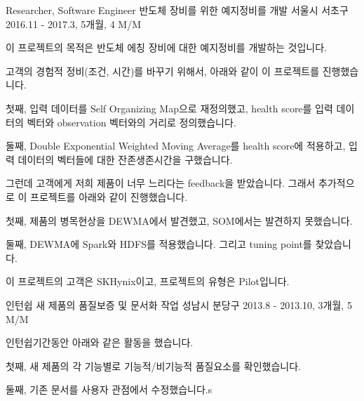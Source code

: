 \begin{cventries}
  \cventry
    {Researcher, Software Engineer} %
    {반도체 장비를 위한 예지정비를 개발} %
    {서울시 서초구} %
    {2016.11 - 2017.3, 5개월, 4 M/M} %
    {
      \begin{cvitems} %
        \item {이 프로젝트의 목적은 반도체 에칭 장비에 대한 예지정비를 개발하는 것입니다.}
        \item {고객의 경험적 정비(조건, 시간)를 바꾸기 위해서, 아래와 같이 이 프로젝트를 진행했습니다.}
        \item {첫째, 입력 데이터를 Self Organizing Map으로 재정의했고, health score를 입력 데이터의 벡터와 observation 벡터와의 거리로 정의했습니다.}
        \item {둘째, Double Exponential Weighted Moving Average를 health score에 적용하고, 입력 데이터의 벡터들에 대한 잔존생존시간을 구했습니다.}
        \item {그런데 고객에게 저희 제품이 너무 느리다는 feedback을 받았습니다. 그래서 추가적으로 이 프로젝트를 아래와 같이 진행했습니다.}
        \item {첫째, 제품의 병목현상을 DEWMA에서 발견했고, SOM에서는 발견하지 못했습니다.}
        \item {둘째, DEWMA에 Spark와 HDFS를 적용했습니다. 그리고 tuning point를 찾았습니다.}
        \item {이 프로젝트의 고객은 SKHynix이고, 프로젝트의 유형은 Pilot입니다.}
      \end{cvitems}
    }

  \cventry
    {인턴쉽} %
    {새 제품의 품질보증 및 문서화 작업} %
    {성남시 분당구} %
    {2013.8 - 2013.10, 3개월, 5 M/M} %
    {
      \begin{cvitems} %
        \item {인턴쉽기간동안 아래와 같은 활동을 했습니다.}
        \item {첫째, 새 제품의 각 기능별로 기능적/비기능적 품질요소를 확인했습니다.}
        \item {둘째, 기존 문서를 사용자 관점에서 수정했습니다.s}
      \end{cvitems}
    }

\end{cventries}
